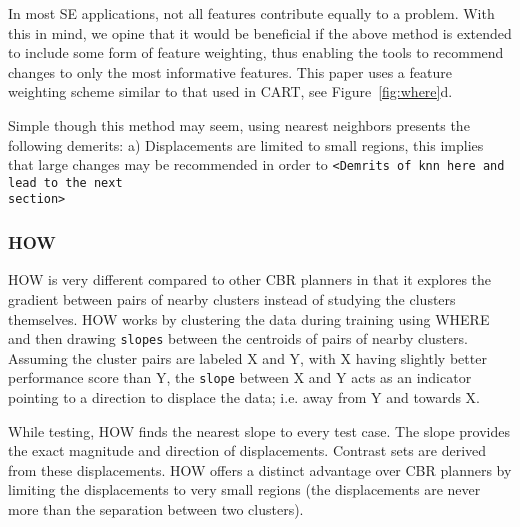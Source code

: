 \documentclass{sig-alternate}
\newcommand{\fig}[1]{Figure~\ref{fig:#1}}
\begin{document}
In most SE applications, not all features contribute equally to a problem. With this in mind, we opine that it would be beneficial if the above method is extended to include some form of feature weighting, thus enabling the tools to recommend changes to only the most informative features. This paper uses a feature weighting scheme similar to that used in CART, see \fig{where}d.

Simple though this method may seem, using nearest neighbors presents the following demerits: a) Displacements are limited to small regions, this implies that large changes may be recommended in order to 
\texttt{<Demrits of knn here and lead to the next\\ section>}

\subsubsection{HOW}

HOW is very different compared to other CBR planners in that it explores the gradient between pairs of nearby clusters instead of studying the clusters themselves. HOW works by clustering the data during training using WHERE and then drawing \texttt{slopes} between the centroids of pairs of nearby clusters. Assuming the cluster pairs are labeled X and Y, with X having slightly better performance score than Y, the \texttt{slope} between X and Y acts as an indicator pointing to a direction to displace the data; i.e. away from Y and towards X. 

While testing, HOW finds the nearest slope to every test case. The slope provides the exact magnitude and direction of displacements. Contrast sets are derived from these displacements. HOW offers a distinct advantage over CBR planners by limiting the displacements to very small regions (the displacements are never more than the separation between two clusters). 
\end{document}

